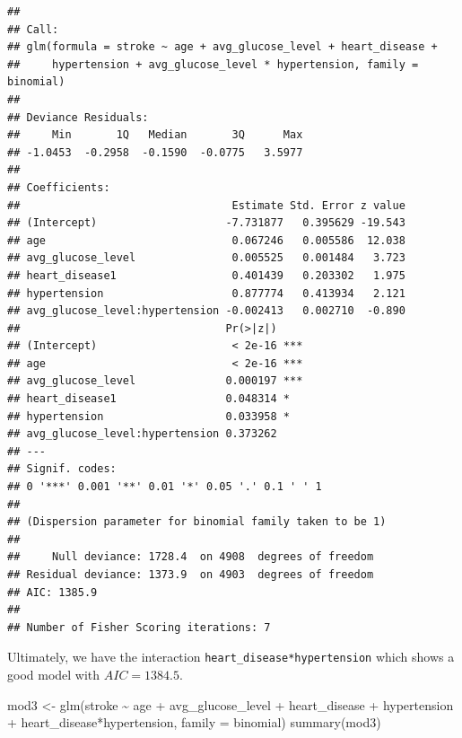 \documentclass[
]{article}
\newenvironment{Shaded}{\begin{snugshade}}{\end{snugshade}}
\newcommand{\AttributeTok}[1]{\textcolor[rgb]{0.77,0.63,0.00}{#1}}
\newcommand{\FunctionTok}[1]{\textcolor[rgb]{0.00,0.00,0.00}{#1}}
\newcommand{\NormalTok}[1]{#1}
\newcommand{\OtherTok}[1]{\textcolor[rgb]{0.56,0.35,0.01}{#1}}
\newcommand{\SpecialCharTok}[1]{\textcolor[rgb]{0.00,0.00,0.00}{#1}}
\begin{document}
\begin{verbatim}
## 
## Call:
## glm(formula = stroke ~ age + avg_glucose_level + heart_disease + 
##     hypertension + avg_glucose_level * hypertension, family = binomial)
## 
## Deviance Residuals: 
##     Min       1Q   Median       3Q      Max  
## -1.0453  -0.2958  -0.1590  -0.0775   3.5977  
## 
## Coefficients:
##                                 Estimate Std. Error z value
## (Intercept)                    -7.731877   0.395629 -19.543
## age                             0.067246   0.005586  12.038
## avg_glucose_level               0.005525   0.001484   3.723
## heart_disease1                  0.401439   0.203302   1.975
## hypertension                    0.877774   0.413934   2.121
## avg_glucose_level:hypertension -0.002413   0.002710  -0.890
##                                Pr(>|z|)    
## (Intercept)                     < 2e-16 ***
## age                             < 2e-16 ***
## avg_glucose_level              0.000197 ***
## heart_disease1                 0.048314 *  
## hypertension                   0.033958 *  
## avg_glucose_level:hypertension 0.373262    
## ---
## Signif. codes:  
## 0 '***' 0.001 '**' 0.01 '*' 0.05 '.' 0.1 ' ' 1
## 
## (Dispersion parameter for binomial family taken to be 1)
## 
##     Null deviance: 1728.4  on 4908  degrees of freedom
## Residual deviance: 1373.9  on 4903  degrees of freedom
## AIC: 1385.9
## 
## Number of Fisher Scoring iterations: 7
\end{verbatim}

Ultimately, we have the interaction \texttt{heart\_disease*hypertension}
which shows a good model with \(AIC = 1384.5\).

\begin{Shaded}
\begin{Highlighting}[]
\NormalTok{mod3 }\OtherTok{\textless{}{-}} \FunctionTok{glm}\NormalTok{(stroke }\SpecialCharTok{\textasciitilde{}}\NormalTok{ age }\SpecialCharTok{+}\NormalTok{ avg\_glucose\_level }\SpecialCharTok{+}\NormalTok{ heart\_disease }\SpecialCharTok{+}\NormalTok{ hypertension }\SpecialCharTok{+} 
\NormalTok{            heart\_disease}\SpecialCharTok{*}\NormalTok{hypertension, }\AttributeTok{family =}\NormalTok{ binomial)}
\FunctionTok{summary}\NormalTok{(mod3)}
\end{Highlighting}
\end{Shaded}
\end{document}
